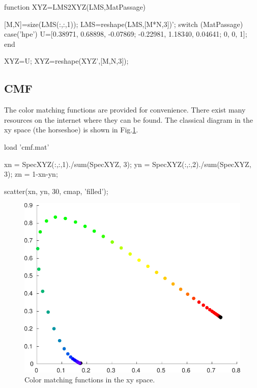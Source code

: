 \begin{matlab}
function XYZ=LMS2XYZ(LMS,MatPassage)

[M,N]=size(LMS(:,:,1)); 
LMS=reshape(LMS,[M*N,3])';
switch (MatPassage)
    case('hpe')
    U=[0.38971, 0.68898, -0.07869; -0.22981, 1.18340, 0.04641; 0, 0, 1];
end

XYZ=U\LMS; %
XYZ=reshape(XYZ',[M,N,3]);
\end{matlab}

\subsection{CMF}
The color matching functions are provided for convenience. There exist many resources on the internet where they can be found. The classical diagram in the xy space (the horseshoe) is shown in Fig.\ref{fig:colip:matlab:xy}.

\begin{matlab}
load 'cmf.mat'

xn = SpecXYZ(:,:,1)./sum(SpecXYZ, 3);
yn = SpecXYZ(:,:,2)./sum(SpecXYZ, 3);
zn = 1-xn-yn;

scatter(xn, yn, 30, cmap, 'filled');
\end{matlab}

\begin{figure}[htbp]
	\centering
	\includegraphics[width=.8\linewidth]{xy.pdf}
	\caption{Color matching functions in the xy space.}
	\label{fig:colip:matlab:xy}
\end{figure}

